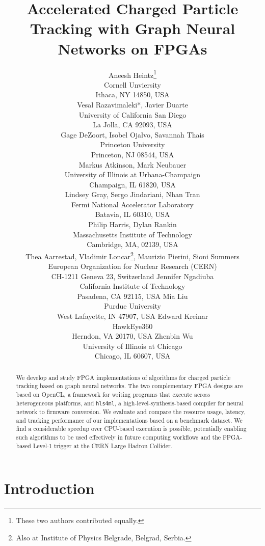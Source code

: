 \documentclass{article}
\title{Accelerated Charged Particle Tracking with Graph Neural Networks on FPGAs}
\author{
  Aneesh Heintz\thanks{These two authors contributed equally.} \\
  Cornell Unviersity \\
  Ithaca, NY 14850, USA\\
  \And
  Vesal Razavimaleki*, Javier Duarte\\
  University of California San Diego\\
  La Jolla, CA 92093, USA \\
  \And
  Gage DeZoort, Isobel Ojalvo, Savannah Thais \\
  Princeton University \\
  Princeton, NJ 08544, USA \\
  \And
  Markus Atkinson, Mark Neubauer\\
  University of Illinois at Urbana-Champaign \\
  Champaign, IL 61820, USA\\
  \And
  Lindsey Gray, Sergo Jindariani, Nhan Tran \\
  Fermi National Accelerator Laboratory \\
  Batavia, IL 60310, USA\\
  \And
  Philip Harris, Dylan Rankin \\
  Massachusetts Institute of Technology \\
  Cambridge, MA, 02139, USA\\
  \And
  Thea Aarrestad, Vladimir Loncar\thanks{Also at Institute of Physics Belgrade, Belgrad, Serbia.}, Maurizio Pierini, Sioni Summers \\
  European Organization for Nuclear Research (CERN) \\
  CH-1211 Geneva 23, Switzerland
  \And
  Jennifer Ngadiuba \\
  California Institute of Technology \\
  Pasadena, CA 92115, USA
  \And
  Mia Liu \\
  Purdue University \\
  West Lafayette, IN 47907, USA
  \And
  Edward Kreinar\\
  HawkEye360\\
  Herndon, VA 20170, USA
  \And
  Zhenbin Wu\\
  University of Illinois at Chicago\\
  Chicago, IL 60607, USA
}
\newcommand{\TODO}[1]{\textcolor{red}{TODO: #1}}
\newcommand{\hlsfml}{\texttt{hls4ml}\xspace}
\begin{document}

\maketitle

\begin{abstract}
We develop and study FPGA implementations of algorithms for charged particle tracking based on graph neural networks. 
The two complementary FPGA designs are based on OpenCL, a framework for writing programs that execute across heterogeneous platforms, and \hlsfml, a high-level-synthesis-based compiler for neural network to firmware conversion.
We evaluate and compare the resource usage, latency, and tracking performance of our implementations based on a benchmark dataset.
We find a considerable speedup over CPU-based execution is possible, potentially enabling such algorithms to be used effectively in future computing workflows and the FPGA-based Level-1 trigger at the CERN Large Hadron Collider.
\end{abstract}

\section{Introduction}
\end{document}
